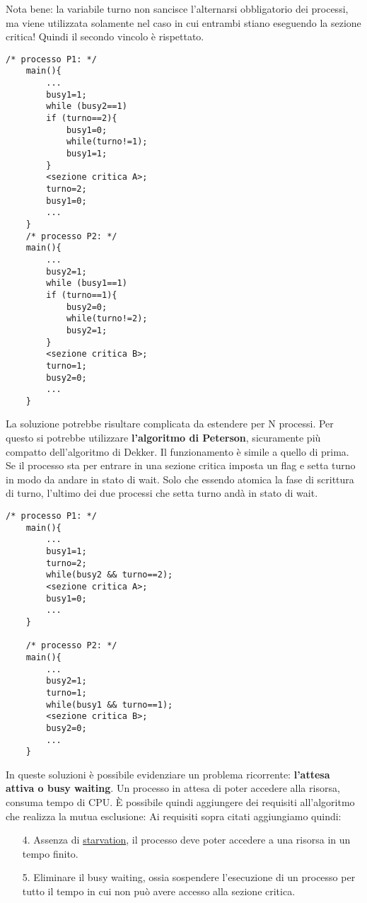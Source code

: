 \documentclass{article}
\begin{document}
 \noindent Nota bene: la variabile turno non sancisce l'alternarsi obbligatorio dei processi, ma viene utilizzata solamente nel caso in cui 
 entrambi stiano eseguendo la sezione critica! Quindi il secondo vincolo è rispettato.

 \begin{lstlisting}[style=CStyle]
    /* processo P1: */
    main(){ 
        ...
        busy1=1;
        while (busy2==1)
        if (turno==2){ 
            busy1=0;
            while(turno!=1);
            busy1=1;
        }
        <sezione critica A>;
        turno=2;
        busy1=0;
        ...
    }
    /* processo P2: */
    main(){ 
        ...
        busy2=1;
        while (busy1==1)
        if (turno==1){
            busy2=0;
            while(turno!=2);
            busy2=1;
        }
        <sezione critica B>;
        turno=1;
        busy2=0;
        ...
    }
\end{lstlisting} 
\medskip

\noindent La soluzione potrebbe risultare complicata da estendere per N processi. Per questo si potrebbe utilizzare
\textbf{l'algoritmo di Peterson}, sicuramente più compatto dell'algoritmo di Dekker. Il funzionamento è simile a quello di prima.
Se il processo sta per entrare in una sezione critica imposta un flag e setta turno in modo da andare in stato di wait. Solo che 
essendo atomica la fase di scrittura di turno, l'ultimo dei due processi che setta turno andà in stato di wait.

\begin{lstlisting}[style=CStyle]
    /* processo P1: */
    main(){ 
        ...
        busy1=1;
        turno=2; 
        while(busy2 && turno==2); 
        <sezione critica A>;
        busy1=0;
        ...
    }

    /* processo P2: */
    main(){
        ...
        busy2=1;
        turno=1;
        while(busy1 && turno==1);
        <sezione critica B>;
        busy2=0;
        ...
    }
\end{lstlisting} 

\noindent In queste soluzioni è possibile evidenziare un problema ricorrente: \textbf{l'attesa attiva o busy waiting}. Un processo
in attesa di poter accedere alla risorsa, consuma tempo di CPU. È possibile quindi aggiungere dei requisiti all'algoritmo che 
realizza la mutua esclusione:
Ai requisiti sopra citati aggiungiamo quindi:
\begin{itemize}
    \item[4.] Assenza di \underline{starvation}, il processo deve poter accedere a una risorsa in un tempo finito.
    \item[5.] Eliminare il busy waiting, ossia sospendere l'esecuzione di un processo per tutto il tempo in cui non può
     avere accesso alla sezione critica.
\end{itemize}
\end{document}

